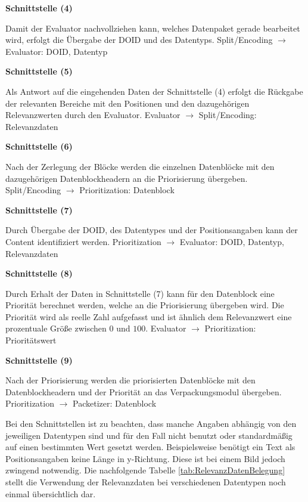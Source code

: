\textbf{Schnittstelle (4)} 

Damit der Evaluator nachvollziehen kann, welches Datenpaket gerade bearbeitet
wird, erfolgt die Übergabe der \gls{DOID} und des Datentyps. \newline
Split/Encoding $\rightarrow$ Evaluator: \gls{DOID}, Datentyp

\textbf{Schnittstelle (5)}

Als Antwort auf die eingehenden Daten der Schnittstelle (4)
erfolgt die Rückgabe der relevanten Bereiche mit den Positionen und den
dazugehörigen Relevanzwerten durch den Evaluator. \newline
Evaluator $\rightarrow$ Split/Encoding: Relevanzdaten   

\textbf{Schnittstelle (6)} 

Nach der Zerlegung der Blöcke werden die einzelnen
Datenblöcke mit den dazugehörigen Datenblockheadern an die
Priorisierung übergeben. \newline
Split/Encoding $\rightarrow$ Prioritization: Datenblock

\textbf{Schnittstelle (7)}

Durch Übergabe der \gls{DOID}, des Datentypes und der Positionsangaben kann der
Content identifiziert werden. \newline
Prioritization $\rightarrow$ Evaluator: \gls{DOID}, Datentyp, Relevanzdaten

\textbf{Schnittstelle (8)}

Durch Erhalt der Daten in Schnittstelle (7) kann für
den Datenblock eine Priorität berechnet werden, welche an die Priorisierung übergeben
wird. Die Priorität wird als reelle Zahl aufgefasst und ist ähnlich dem
Relevanzwert eine prozentuale Größe zwischen $0$ und $100$. \newline
Evaluator $\rightarrow$ Prioritization: Prioritätswert

\textbf{Schnittstelle (9)}

Nach der Priorisierung werden die priorisierten Datenblöcke mit den
Datenblockheadern und der Priorität an das Verpackungsmodul übergeben. \newline
Prioritization $\rightarrow$ Packetizer: Datenblock

Bei den Schnittstellen ist zu beachten, dass manche Angaben abhängig von den
jeweiligen Datentypen sind und für den Fall nicht benutzt oder
standardmäßig auf einen bestimmten Wert gesetzt werden. Beispielsweise benötigt
ein Text als Positionsangaben keine Länge in y-Richtung. Diese ist bei einem
Bild jedoch zwingend notwendig. Die nachfolgende Tabelle
\ref{tab:RelevanzDatenBelegung} stellt die Verwendung der Relevanzdaten bei
verschiedenen Datentypen noch einmal übersichtlich dar.

